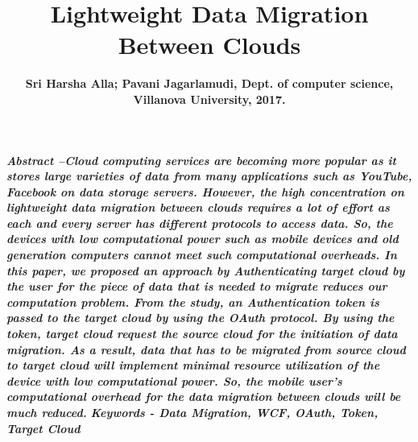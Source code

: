 \documentclass[11pt, pdftex, conference]{IEEEtran}
\title{Lightweight Data Migration Between Clouds}
\author{\textbf{Sri Harsha Alla; Pavani Jagarlamudi, Dept. of computer science, Villanova University, 2017.}  }
\begin{document}
\maketitle
\textbf{{\textit{Abstract --\hspace{10mm}Cloud computing services are becoming more popular as it stores large varieties of data from many applications such as YouTube, Facebook on data storage servers. However, the high concentration on lightweight data migration between clouds requires a lot of effort as each and every server has different protocols to access data. So, the devices with low computational power such as mobile devices and old generation computers cannot meet such computational overheads. In this paper, we proposed an approach by Authenticating target cloud by the user for the piece of data that is needed to migrate reduces our computation problem. From the study, an Authentication token is passed to the target cloud by using the OAuth protocol. By using the token, target cloud request the source cloud for the initiation of data migration. As a result, data that has to be migrated from source cloud to target cloud will implement minimal resource utilization of the device with low computational power. So, the mobile user’s computational overhead for the data migration between clouds will be much reduced.}}}\linebreak
\linebreak
\textbf{\textit{Keywords - Data Migration, WCF, OAuth, Token, Target Cloud}}
\end{document}
